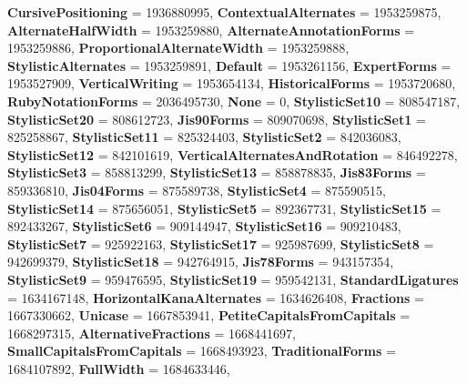 \begin{DoxyCompactItemize}
{\bfseries Cursive\+Positioning} = 1936880995, 
\newline
{\bfseries Contextual\+Alternates} = 1953259875, 
{\bfseries Alternate\+Half\+Width} = 1953259880, 
{\bfseries Alternate\+Annotation\+Forms} = 1953259886, 
{\bfseries Proportional\+Alternate\+Width} = 1953259888, 
\newline
{\bfseries Stylistic\+Alternates} = 1953259891, 
{\bfseries Default} = 1953261156, 
{\bfseries Expert\+Forms} = 1953527909, 
{\bfseries Vertical\+Writing} = 1953654134, 
\newline
{\bfseries Historical\+Forms} = 1953720680, 
{\bfseries Ruby\+Notation\+Forms} = 2036495730, 
{\bfseries None} = 0, 
{\bfseries Stylistic\+Set10} = 808547187, 
\newline
{\bfseries Stylistic\+Set20} = 808612723, 
{\bfseries Jis90\+Forms} = 809070698, 
{\bfseries Stylistic\+Set1} = 825258867, 
{\bfseries Stylistic\+Set11} = 825324403, 
\newline
{\bfseries Stylistic\+Set2} = 842036083, 
{\bfseries Stylistic\+Set12} = 842101619, 
{\bfseries Vertical\+Alternates\+And\+Rotation} = 846492278, 
{\bfseries Stylistic\+Set3} = 858813299, 
\newline
{\bfseries Stylistic\+Set13} = 858878835, 
{\bfseries Jis83\+Forms} = 859336810, 
{\bfseries Jis04\+Forms} = 875589738, 
{\bfseries Stylistic\+Set4} = 875590515, 
\newline
{\bfseries Stylistic\+Set14} = 875656051, 
{\bfseries Stylistic\+Set5} = 892367731, 
{\bfseries Stylistic\+Set15} = 892433267, 
{\bfseries Stylistic\+Set6} = 909144947, 
\newline
{\bfseries Stylistic\+Set16} = 909210483, 
{\bfseries Stylistic\+Set7} = 925922163, 
{\bfseries Stylistic\+Set17} = 925987699, 
{\bfseries Stylistic\+Set8} = 942699379, 
\newline
{\bfseries Stylistic\+Set18} = 942764915, 
{\bfseries Jis78\+Forms} = 943157354, 
{\bfseries Stylistic\+Set9} = 959476595, 
{\bfseries Stylistic\+Set19} = 959542131, 
\newline
{\bfseries Standard\+Ligatures} = 1634167148, 
{\bfseries Horizontal\+Kana\+Alternates} = 1634626408, 
{\bfseries Fractions} = 1667330662, 
{\bfseries Unicase} = 1667853941, 
\newline
{\bfseries Petite\+Capitals\+From\+Capitals} = 1668297315, 
{\bfseries Alternative\+Fractions} = 1668441697, 
{\bfseries Small\+Capitals\+From\+Capitals} = 1668493923, 
{\bfseries Traditional\+Forms} = 1684107892, 
\newline
{\bfseries Full\+Width} = 1684633446, 

\end{DoxyCompactItemize}
